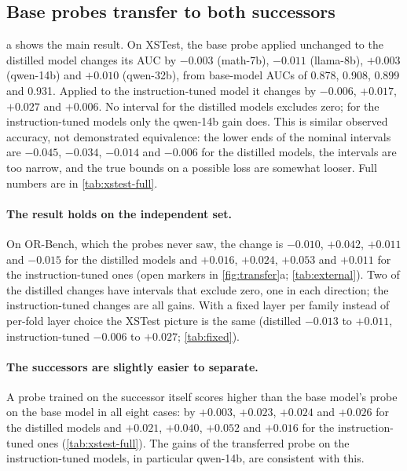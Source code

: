 \documentclass[10pt]{article}
\begin{document}
\subsection{Base probes transfer to both successors}
\label{sec:transfer}

a shows the main result. On XSTest, the base probe applied unchanged to the distilled model changes its AUC by $-0.003$ (math-7b), $-0.011$ (llama-8b), $+0.003$ (qwen-14b) and $+0.010$ (qwen-32b), from base-model AUCs of 0.878, 0.908, 0.899 and 0.931. Applied to the instruction-tuned model it changes by $-0.006$, $+0.017$, $+0.027$ and $+0.006$. No interval for the distilled models excludes zero; for the instruction-tuned models only the qwen-14b gain does. This is similar observed accuracy, not demonstrated equivalence: the lower ends of the nominal intervals are $-0.045$, $-0.034$, $-0.014$ and $-0.006$ for the distilled models, the intervals are too narrow, and the true bounds on a possible loss are somewhat looser. Full numbers are in \cref{tab:xstest-full}.

\paragraph{The result holds on the independent set.} On OR-Bench, which the probes never saw, the change is $-0.010$, $+0.042$, $+0.011$ and $-0.015$ for the distilled models and $+0.016$, $+0.024$, $+0.053$ and $+0.011$ for the instruction-tuned ones (open markers in \cref{fig:transfer}a; \cref{tab:external}). Two of the distilled changes have intervals that exclude zero, one in each direction; the instruction-tuned changes are all gains. With a fixed layer per family instead of per-fold layer choice the XSTest picture is the same (distilled $-0.013$ to $+0.011$, instruction-tuned $-0.006$ to $+0.027$; \cref{tab:fixed}).

\paragraph{The successors are slightly easier to separate.} A probe trained on the successor itself scores higher than the base model's probe on the base model in all eight cases: by $+0.003$, $+0.023$, $+0.024$ and $+0.026$ for the distilled models and $+0.021$, $+0.040$, $+0.052$ and $+0.016$ for the instruction-tuned ones (\cref{tab:xstest-full}). The gains of the transferred probe on the instruction-tuned models, in particular qwen-14b, are consistent with this.
\end{document}
